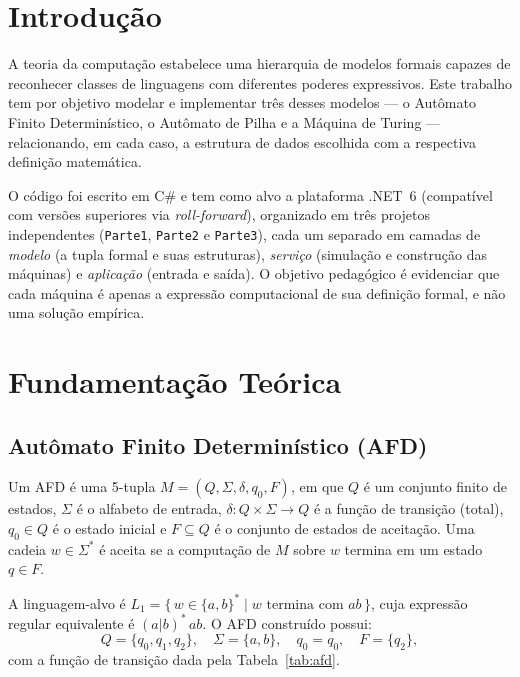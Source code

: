\documentclass[12pt,a4paper]{article}
\begin{document}
\tableofcontents
\newpage

\section{Introdução}
A teoria da computação estabelece uma hierarquia de modelos formais capazes de
reconhecer classes de linguagens com diferentes poderes expressivos. Este
trabalho tem por objetivo modelar e implementar três desses modelos --- o
Autômato Finito Determinístico, o Autômato de Pilha e a Máquina de Turing ---
relacionando, em cada caso, a estrutura de dados escolhida com a respectiva
definição matemática.

O código foi escrito em C\# e tem como alvo a plataforma .NET~6 (compatível com
versões superiores via \emph{roll-forward}), organizado em três
projetos independentes (\texttt{Parte1}, \texttt{Parte2} e \texttt{Parte3}), cada
um separado em camadas de \emph{modelo} (a tupla formal e suas estruturas),
\emph{serviço} (simulação e construção das máquinas) e \emph{aplicação}
(entrada e saída). O objetivo pedagógico é evidenciar que cada máquina é apenas a
expressão computacional de sua definição formal, e não uma solução empírica.

\section{Fundamentação Teórica}

\subsection{Autômato Finito Determinístico (AFD)}
Um AFD é uma 5-tupla $M = (Q, \Sigma, \delta, q_0, F)$, em que $Q$ é um conjunto
finito de estados, $\Sigma$ é o alfabeto de entrada,
$\delta: Q \times \Sigma \to Q$ é a função de transição (total), $q_0 \in Q$ é o
estado inicial e $F \subseteq Q$ é o conjunto de estados de aceitação. Uma cadeia
$w \in \Sigma^*$ é aceita se a computação de $M$ sobre $w$ termina em um estado
$q \in F$.

A linguagem-alvo é $L_1 = \{\, w \in \{a,b\}^* \mid w \text{ termina com } ab \,\}$,
cuja expressão regular equivalente é $(a|b)^*\,ab$. O AFD construído possui:
\[
Q=\{q_0,q_1,q_2\},\quad \Sigma=\{a,b\},\quad q_0=q_0,\quad F=\{q_2\},
\]
com a função de transição dada pela Tabela~\ref{tab:afd}.
\end{document}

